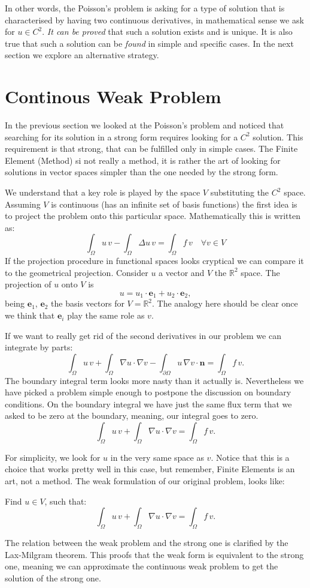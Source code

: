 \documentclass[11pt]{amsart}
\begin{document}
In other words, the Poisson's problem is asking for a type of solution 
that is characterised by having two continuous derivatives, in mathematical 
sense we ask for $u\in C^2$. \emph{It can be proved} that such a solution exists and 
is unique. It is also true that such a solution can be \emph{found} in simple and
specific cases. In the next section we explore an alternative strategy.

\section{Continous Weak Problem}
In the previous section we looked at the Poisson's problem and noticed that searching 
for its solution in a strong form requires looking for a $C^2$ solution. This requirement 
is that strong, that can be fulfilled only in simple cases. 
The Finite Element (Method) si not really a method, it is rather the art of looking 
for solutions in vector spaces simpler than the one needed by the strong form.

We understand that a key role is played by the space $V$ substituting 
the $C^2$ space. Assuming $V$ is continuous (has an infinite set of basis 
functions) the first idea is to project the problem onto this particular space. 
Mathematically this is written as:
\[
\int_\Omega u\, v -\int_\Omega \Delta u\, v = \int_\Omega f\, v \quad \forall v \in V
\]
If the projection procedure in functional spaces looks cryptical 
we can compare it to the geometrical projection. Consider $u$ a vector 
and $V$ the $\mathbb{R}^2$ space. The projection of $u$ onto $V$ is
\[
u = u_1 \cdot \mathbf{e}_1 + u_2 \cdot \mathbf{e}_2,
\]
being $\mathbf{e}_1$, $\mathbf{e}_2$ the basis vectors for $V = \mathbb{R}^2$.
The analogy here should be clear once we think that $\mathbf{e}_i$ play the 
same role as $v$.  

If we want to really get rid of the second derivatives in our problem we can 
integrate by parts:
\[
\int_\Omega u\, v +
\int_\Omega \nabla u \cdot \nabla v - 
\int_{\partial \Omega} u \,\nabla v \cdot \mathbf{n} = \int_\Omega f\, v.
\]
The boundary integral term looks more nasty than it actually is. 
Nevertheless we have picked a problem simple enough to postpone the 
discussion on boundary conditions. On the boundary integral we have just
the same flux term that we asked to be zero at the boundary, meaning, our 
integral goes to zero.
\[
\int_\Omega u\, v +
\int_\Omega \nabla u \cdot \nabla v = \int_\Omega f\, v.
\]

For simplicity, we look for $u$ in the very same space as $v$. 
Notice that this is a choice that works pretty well in this case, but
remember, Finite Elements is an art, not a method. The weak formulation 
of our original problem, looks like:

Find $u\in V$, such that:
\[
\int_\Omega u\, v +
\int_\Omega \nabla u \cdot \nabla v = \int_\Omega f\, v.
\]

The relation between the weak problem and the strong one 
is clarified by the Lax-Milgram theorem. This proofs 
that the weak form is equivalent to the strong one, meaning 
we can approximate the continuous weak problem to get the solution 
of the strong one.
\end{document}
